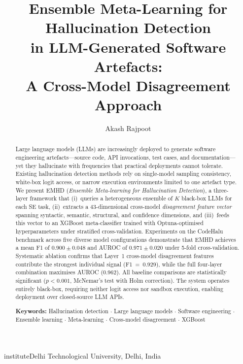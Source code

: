 \documentclass[runningheads]{llncs}
\newcommand{\method}{\textsc{EMHD}}
\begin{document}
\title{Ensemble Meta-Learning for Hallucination Detection\\in LLM-Generated Software Artefacts:\\A Cross-Model Disagreement Approach}

\author{Akash Rajpoot}


institute{Delhi Technological University, Delhi, India\\}
\maketitle

\begin{abstract}
Large language models (LLMs) are increasingly deployed to generate software engineering artefacts---source code, API invocations, test cases, and documentation---yet they hallucinate with frequencies that practical deployments cannot tolerate. Existing hallucination detection methods rely on single-model sampling consistency, white-box logit access, or narrow execution environments limited to one artefact type. We present \method{} (\textit{Ensemble Meta-learning for Hallucination Detection}), a three-layer framework that (i)~queries a heterogeneous ensemble of $K$ black-box LLMs for each SE task, (ii)~extracts a 43-dimensional cross-model \emph{disagreement feature vector} spanning syntactic, semantic, structural, and confidence dimensions, and (iii)~feeds this vector to an XGBoost meta-classifier trained with Optuna-optimised hyperparameters under stratified cross-validation. Experiments on the CodeHalu benchmark across five diverse model configurations demonstrate that \method{} achieves a mean F1 of $0.900 \pm 0.048$ and AUROC of $0.971 \pm 0.020$ under 5-fold cross-validation. Systematic ablation confirms that Layer~1 cross-model disagreement features contribute the strongest individual signal (F1~=~0.929), while the full four-layer combination maximises AUROC (0.962). All baseline comparisons are statistically significant ($p < 0.001$, McNemar's test with Holm correction). The system operates entirely black-box, requiring neither logit access nor sandbox execution, enabling deployment over closed-source LLM APIs.

\smallskip
\noindent\textbf{Keywords:} Hallucination detection $\cdot$ Large language models $\cdot$ Software engineering $\cdot$ Ensemble learning $\cdot$ Meta-learning $\cdot$ Cross-model disagreement $\cdot$ XGBoost
\end{abstract}
\end{document}
